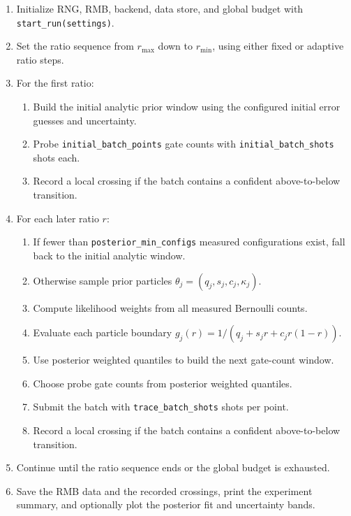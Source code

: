 \documentclass[11pt]{article}
\begin{document}
\begin{enumerate}[leftmargin=*]
    \item Initialize RNG, RMB, backend, data store, and global budget with
    \texttt{start\_run(settings)}.
    \item Set the ratio sequence from $r_{\max}$ down to $r_{\min}$, using
    either fixed or adaptive ratio steps.
    \item For the first ratio:
    \begin{enumerate}
        \item Build the initial analytic prior window using the configured
        initial error guesses and uncertainty.
        \item Probe \texttt{initial\_batch\_points} gate counts with
        \texttt{initial\_batch\_shots} shots each.
        \item Record a local crossing if the batch contains a confident
        above-to-below transition.
    \end{enumerate}
    \item For each later ratio $r$:
    \begin{enumerate}
        \item If fewer than \texttt{posterior\_min\_configs} measured
        configurations exist, fall back to the initial analytic window.
        \item Otherwise sample prior particles
        $\theta_j=(q_j,s_j,c_j,\kappa_j)$.
        \item Compute likelihood weights from all measured Bernoulli counts.
        \item Evaluate each particle boundary
        $g_j(r)=1/(q_j+s_jr+c_jr(1-r))$.
        \item Use posterior weighted quantiles to build the next gate-count
        window.
        \item Choose probe gate counts from posterior weighted quantiles.
        \item Submit the batch with \texttt{trace\_batch\_shots} shots per
        point.
        \item Record a local crossing if the batch contains a confident
        above-to-below transition.
    \end{enumerate}
    \item Continue until the ratio sequence ends or the global budget is
    exhausted.
    \item Save the RMB data and the recorded crossings, print the experiment
    summary, and optionally plot the posterior fit and uncertainty bands.
\end{enumerate}
\end{document}
